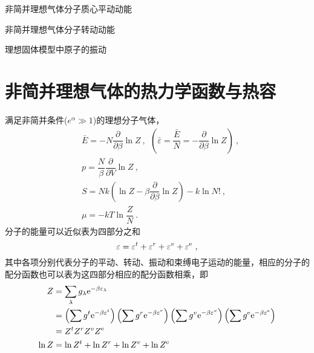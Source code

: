 \documentclass[12pt,a4paper]{article}
\begin{document}
非简并理想气体分子质心平动动能










非简并理想气体分子转动动能








理想固体模型中原子的振动











\section{非简并理想气体的热力学函数与热容}
满足非简并条件($e^{\alpha} \gg 1$)的理想分子气体，
\begin{align}
& \bar{E} = - N \dfrac{\partial}{\partial \beta} \ln Z ~, ~~ \left(\bar{\varepsilon} = \dfrac{\bar{E}}{N} = -\dfrac{\partial}{\partial \beta} \ln Z  \right) ~, \\
& p = \dfrac{N}{\beta} \dfrac{\partial}{\partial V} \ln Z ~, \\
& S = Nk \left(\ln Z -\beta \dfrac{\partial}{\partial \beta} \ln Z \right) - k \ln N! ~, \\
& \mu = -k T \ln \dfrac{Z}{N} ~.
\end{align}
分子的能量可以近似表为四部分之和
\begin{equation}
\varepsilon = \varepsilon^t + \varepsilon^r +\varepsilon^v +\varepsilon^{\rm e} ~,
\end{equation}
其中各项分别代表分子的平动、转动、振动和束缚电子运动的能量，相应的分子的配分函数也可以表为这四部分相应的配分函数相乘，即
\begin{align}
\nonumber Z &= \sum_\lambda g_\lambda {\rm e}^{-\beta  \varepsilon_\lambda} \\
\nonumber &= \left(\sum g^t {\rm e}^{-\beta  \varepsilon^t} \right) \left(\sum g^r {\rm e}^{-\beta  \varepsilon^r} \right) \left(\sum g^v {\rm e}^{-\beta  \varepsilon^v} \right) \left(\sum g^{\rm e} {\rm e}^{-\beta  \varepsilon^{\rm e}} \right) \\
\nonumber &= Z^t Z^r Z^v Z^{\rm e} \\
\ln Z &= \ln Z^t +\ln Z^r +\ln Z^v +\ln Z^{\rm e}
\end{align}
\end{document}
